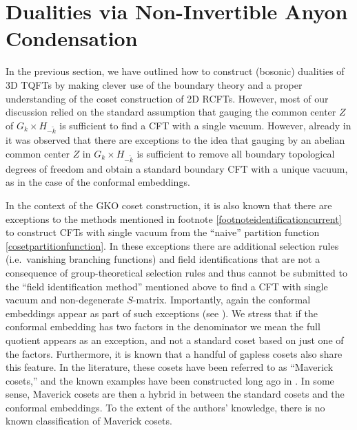 \documentclass[11pt]{article}
\numberwithin{equation}{section}
\begin{document}
\section{Dualities via Non-Invertible Anyon Condensation}  \label{noninvertibleextensionsubsection}

In the previous section, we have outlined how to construct (bosonic) dualities of 3D TQFTs by making clever use of the boundary theory and a proper understanding of the coset construction of 2D RCFTs. However, most of our discussion relied on the standard assumption \cite{Moore:1989yh} that gauging the common center $Z$ of $G_{k} \times H_{-\tilde{k}}$  is sufficient to find a CFT with a single vacuum. However, already in \cite{Moore:1989yh} it was observed that there are exceptions to the idea that gauging by an abelian common center $Z$ in $G_{k} \times H_{-\tilde{k}}$ is sufficient to remove all boundary topological degrees of freedom and obtain a standard boundary CFT with a unique vacuum, as in the case of the conformal embeddings.

In the context of the GKO coset construction, it is also known that there are exceptions to the methods mentioned in footnote \ref{footnoteidentificationcurrent} to construct CFTs with single vacuum from the ``naive'' partition function \eqref{cosetpartitionfunction}. In these exceptions there are additional selection rules (i.e.\, vanishing branching functions) and field identifications that are not a consequence of group-theoretical selection rules and thus cannot be submitted to the ``field identification method'' \cite{Gepner:1989jq} mentioned above to find a CFT with single vacuum and non-degenerate $S$-matrix. Importantly, again the conformal embeddings appear as part of such exceptions (see \cite{DiFrancesco:1997nk, Pedrini:1999iy}). We stress that if the conformal embedding has two factors in the denominator we mean the full quotient appears as an exception, and not a standard coset based on just one of the factors. Furthermore, it is known that a handful of gapless cosets also share this feature. In the literature, these cosets have been referred to as ``Maverick cosets,'' and the known examples have been constructed long ago in \cite{Pedrini:1999iy, Dunbar:1992gh, Dunbar:1993hr, Fuchs:1995tq}. In some sense, Maverick cosets are then a hybrid in between the standard cosets and the conformal embeddings. To the extent of the authors' knowledge, there is no known classification of Maverick cosets. 
\end{document}
